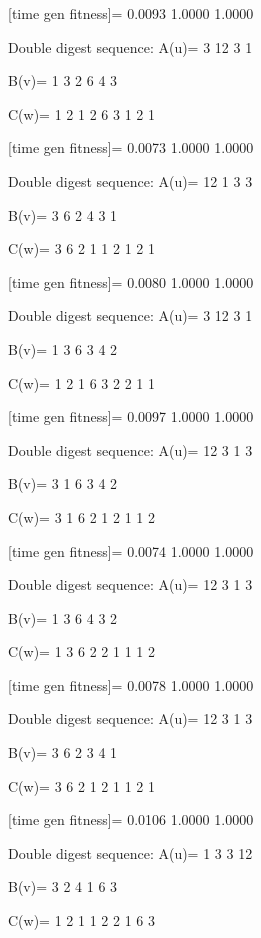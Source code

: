 [time gen fitness]=
    0.0093    1.0000    1.0000

Double digest sequence:
A(u)=
     3    12     3     1

B(v)=
     1     3     2     6     4     3

C(w)=
     1     2     1     2     6     3     1     2     1

[time gen fitness]=
    0.0073    1.0000    1.0000

Double digest sequence:
A(u)=
    12     1     3     3

B(v)=
     3     6     2     4     3     1

C(w)=
     3     6     2     1     1     2     1     2     1

[time gen fitness]=
    0.0080    1.0000    1.0000

Double digest sequence:
A(u)=
     3    12     3     1

B(v)=
     1     3     6     3     4     2

C(w)=
     1     2     1     6     3     2     2     1     1

[time gen fitness]=
    0.0097    1.0000    1.0000

Double digest sequence:
A(u)=
    12     3     1     3

B(v)=
     3     1     6     3     4     2

C(w)=
     3     1     6     2     1     2     1     1     2

[time gen fitness]=
    0.0074    1.0000    1.0000

Double digest sequence:
A(u)=
    12     3     1     3

B(v)=
     1     3     6     4     3     2

C(w)=
     1     3     6     2     2     1     1     1     2

[time gen fitness]=
    0.0078    1.0000    1.0000

Double digest sequence:
A(u)=
    12     3     1     3

B(v)=
     3     6     2     3     4     1

C(w)=
     3     6     2     1     2     1     1     2     1

[time gen fitness]=
    0.0106    1.0000    1.0000

Double digest sequence:
A(u)=
     1     3     3    12

B(v)=
     3     2     4     1     6     3

C(w)=
     1     2     1     1     2     2     1     6     3

